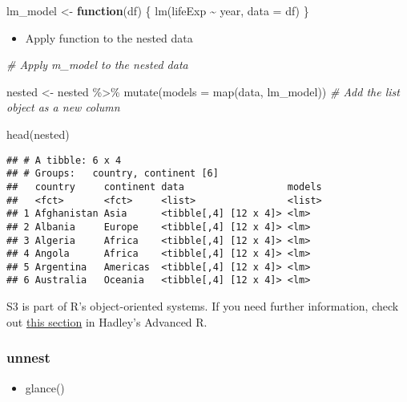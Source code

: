 \documentclass[
]{book}
\newenvironment{Shaded}{\begin{snugshade}}{\end{snugshade}}
\newcommand{\AttributeTok}[1]{\textcolor[rgb]{0.77,0.63,0.00}{#1}}
\newcommand{\CommentTok}[1]{\textcolor[rgb]{0.56,0.35,0.01}{\textit{#1}}}
\newcommand{\ControlFlowTok}[1]{\textcolor[rgb]{0.13,0.29,0.53}{\textbf{#1}}}
\newcommand{\FunctionTok}[1]{\textcolor[rgb]{0.00,0.00,0.00}{#1}}
\newcommand{\NormalTok}[1]{#1}
\newcommand{\OtherTok}[1]{\textcolor[rgb]{0.56,0.35,0.01}{#1}}
\newcommand{\SpecialCharTok}[1]{\textcolor[rgb]{0.00,0.00,0.00}{#1}}
\providecommand{\tightlist}{%
  \setlength{\itemsep}{0pt}\setlength{\parskip}{0pt}}
\begin{document}
\begin{Shaded}
\begin{Highlighting}[]
\NormalTok{lm\_model }\OtherTok{\textless{}{-}} \ControlFlowTok{function}\NormalTok{(df) \{}
  \FunctionTok{lm}\NormalTok{(lifeExp }\SpecialCharTok{\textasciitilde{}}\NormalTok{ year, }\AttributeTok{data =}\NormalTok{ df)}
\NormalTok{\}}
\end{Highlighting}
\end{Shaded}

\begin{itemize}
\tightlist
\item
  Apply function to the nested data
\end{itemize}

\begin{Shaded}
\begin{Highlighting}[]
\CommentTok{\# Apply m\_model to the nested data}

\NormalTok{nested }\OtherTok{\textless{}{-}}\NormalTok{ nested }\SpecialCharTok{\%\textgreater{}\%}
  \FunctionTok{mutate}\NormalTok{(}\AttributeTok{models =} \FunctionTok{map}\NormalTok{(data, lm\_model)) }\CommentTok{\# Add the list object as a new column}

\FunctionTok{head}\NormalTok{(nested)}
\end{Highlighting}
\end{Shaded}

\begin{verbatim}
## # A tibble: 6 x 4
## # Groups:   country, continent [6]
##   country     continent data                  models
##   <fct>       <fct>     <list>                <list>
## 1 Afghanistan Asia      <tibble[,4] [12 x 4]> <lm>  
## 2 Albania     Europe    <tibble[,4] [12 x 4]> <lm>  
## 3 Algeria     Africa    <tibble[,4] [12 x 4]> <lm>  
## 4 Angola      Africa    <tibble[,4] [12 x 4]> <lm>  
## 5 Argentina   Americas  <tibble[,4] [12 x 4]> <lm>  
## 6 Australia   Oceania   <tibble[,4] [12 x 4]> <lm>
\end{verbatim}

S3 is part of R's object-oriented systems. If you need further information, check out \href{http://adv-r.had.co.nz/S3.html}{this section} in Hadley's Advanced R.

\hypertarget{unnest}{%
\subsubsection{unnest}\label{unnest}}

\begin{itemize}
\tightlist
\item
  glance()
\end{itemize}
\end{document}
